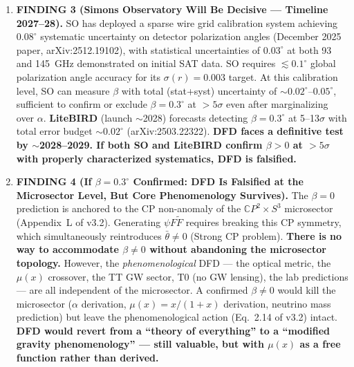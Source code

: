 \documentclass[11pt]{article}
\begin{document}
\begin{tcolorbox}[colback=red!5!white, colframe=red!70!black,
  title=\textbf{TOP 5 FINDINGS (Ranked by Impact on DFD Survival)}]
\begin{enumerate}
\item \textbf{FINDING 3 (Simons Observatory Will Be Decisive ---
  Timeline 2027--28).}
  SO has deployed a sparse wire grid calibration system achieving
  $0.08^\circ$ systematic uncertainty on detector polarization angles
  (December 2025 paper, arXiv:2512.19102), with statistical
  uncertainties of $0.03^\circ$ at both 93 and 145~GHz demonstrated
  on initial SAT data.  SO requires $\lesssim 0.1^\circ$ global
  polarization angle accuracy for its $\sigma(r) = 0.003$ target.
  At this calibration level, SO can measure $\beta$ with total
  (stat+syst) uncertainty of $\sim 0.02^\circ$--$0.05^\circ$,
  sufficient to confirm or exclude $\beta = 0.3^\circ$ at
  $>5\sigma$ even after marginalizing over $\alpha$.
  \textbf{LiteBIRD} (launch $\sim$2028) forecasts detecting
  $\beta = 0.3^\circ$ at 5--13$\sigma$ with total error budget
  $\sim 0.02^\circ$ (arXiv:2503.22322).
  \textbf{DFD faces a definitive test by $\sim$2028--2029.
  If both SO and LiteBIRD confirm $\beta > 0$ at $>5\sigma$
  with properly characterized systematics, DFD is falsified.}

\item \textbf{FINDING 4 (If $\beta = 0.3^\circ$ Confirmed: DFD Is
  Falsified at the Microsector Level, But Core Phenomenology Survives).}
  The $\beta = 0$ prediction is anchored to the CP non-anomaly of the
  $\mathbb{C}P^2 \times S^3$ microsector (Appendix~L of v3.2).
  Generating $\psi F\tilde{F}$ requires breaking this CP symmetry,
  which simultaneously reintroduces $\bar{\theta} \neq 0$ (Strong CP
  problem).  \textbf{There is no way to accommodate $\beta \neq 0$
  without abandoning the microsector topology.}  However, the
  \emph{phenomenological} DFD --- the optical metric, the $\mu(x)$
  crossover, the TT GW sector, T0 (no GW lensing), the lab
  predictions --- are all independent of the microsector.  A
  confirmed $\beta \neq 0$ would kill the microsector ($\alpha$
  derivation, $\mu(x) = x/(1+x)$ derivation, neutrino mass
  prediction) but leave the phenomenological action
  (Eq.~2.14 of v3.2) intact.  \textbf{DFD would revert from a
  ``theory of everything'' to a ``modified gravity phenomenology''
  --- still valuable, but with $\mu(x)$ as a free function rather
  than derived.}


\end{enumerate}
\end{tcolorbox}
\end{document}

